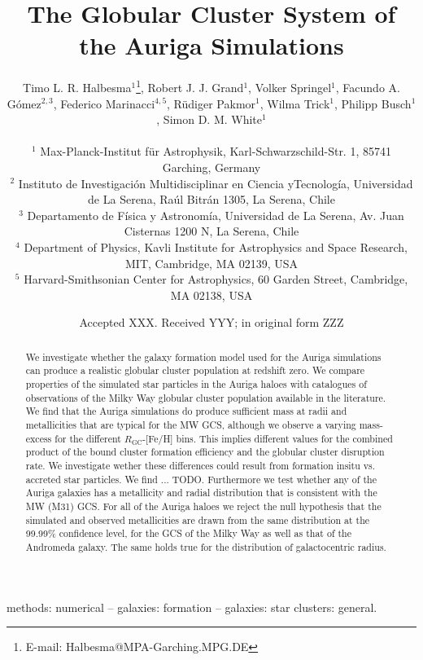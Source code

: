 \documentclass[a4paper,fleqn,usenatbib]{mnras}
\title[Auriga GCS]{The Globular Cluster System of the Auriga Simulations}
\author[T. L. R. Halbesma et al.]{\parbox[t]{\textwidth}{
    Timo L. R. Halbesma$^{1}$\thanks{E-mail: Halbesma@MPA-Garching.MPG.DE},
    Robert J. J. Grand$^{1}$, 
    Volker Springel$^{1}$, 
    Facundo A. G\'{o}mez$^{2,3}$, 
    Federico Marinacci$^{4,5}$,
    R\"{u}diger Pakmor$^{1}$, 
    Wilma Trick$^{1}$,
    Philipp Busch$^{1}$,
    Simon D. M. White$^{1}$
} \vspace{10pt} \\
$^{1}$ Max-Planck-Institut f\"ur Astrophysik, Karl-Schwarzschild-Str. 1,
    85741 Garching, Germany \\
$^{2}$ Instituto de Investigaci\'{o}n Multidisciplinar en Ciencia yTecnolog\'{i}a, 
    Universidad de La Serena, Ra\'{u}l Bitr\'{a}n 1305, La Serena, Chile \\
$^{3}$ Departamento de F\'{i}sica y Astronom\'{i}a, Universidad de La Serena, Av.
    Juan Cisternas 1200 N, La Serena, Chile \\
$^{4}$ Department of Physics, Kavli Institute for Astrophysics and Space Research,
    MIT, Cambridge, MA 02139, USA \\
$^{5}$ Harvard-Smithsonian Center for Astrophysics, 60 Garden Street, Cambridge,
    MA 02138, USA \\
}
\date{Accepted XXX. Received YYY; in original form ZZZ}
\begin{document}
\label{firstpage}
\pagerange{\pageref{firstpage}--\pageref{lastpage}}
\maketitle

\begin{abstract}
We investigate whether the galaxy formation model used for the Auriga simulations 
can produce a realistic globular cluster population at redshift zero. We compare
properties of the simulated star particles in the Auriga haloes with
catalogues of observations of the Milky Way globular cluster population available
in the literature. We find that the Auriga simulations do produce sufficient mass
at radii and metallicities that are typical for the MW GCS, although we observe
a varying mass-excess for the different $R_{\text{GC}}$-[Fe/H] bins. This implies
different values for the combined product of the bound cluster formation efficiency
and the globular cluster disruption rate. We investigate wether these differences
could result from formation insitu vs. accreted star particles. We find ... TODO.
Furthermore we test whether any of the Auriga galaxies has a metallicity and radial
distribution that is consistent with the MW (M31) GCS. For all of the Auriga haloes
we reject the null hypothesis that the simulated and observed metallicities are 
drawn from the same distribution at the 99.99\% confidence level, for the GCS
of the Milky Way as well as that of the Andromeda galaxy. The same holds true for
the distribution of galactocentric radius.
\end{abstract}

\begin{keywords}
methods: numerical -- galaxies: formation -- galaxies: star clusters: general.
\end{keywords}


\end{document}
